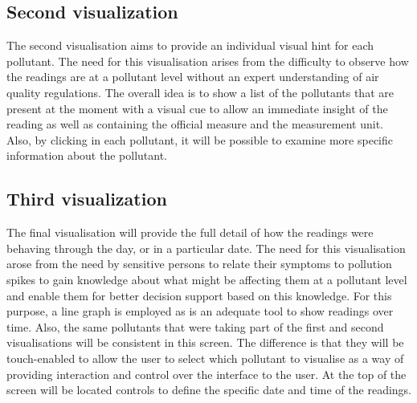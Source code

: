 \subsection{Second visualization}

The second visualisation aims to provide an individual visual hint for each pollutant. The need for this visualisation arises from the difficulty to observe how the readings are at a pollutant level without an expert understanding of air quality regulations. The overall idea is to show a list of the pollutants that are present at the moment with a visual cue to allow an immediate insight of the reading as well as containing the official measure and the measurement unit. Also, by clicking in each pollutant, it will be possible to examine more specific information about the pollutant.

\subsection{Third visualization}

The final visualisation will provide the full detail of how the readings were behaving through the day, or in a particular date. The need for this visualisation arose from the need by sensitive persons to relate their symptoms to pollution spikes to gain knowledge about what might be affecting them at a pollutant level and enable them for better decision support based on this knowledge. For this purpose, a line graph is employed as is an adequate tool to show readings over time. Also, the same pollutants that were taking part of the first and second visualisations will be consistent in this screen. The difference is that they will be touch-enabled to allow the user to select which pollutant to visualise as a way of providing interaction and control over the interface to the user. At the top of the screen will be located controls to define the specific date and time of the readings. 
